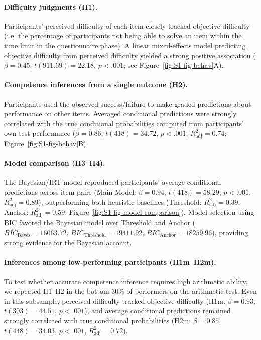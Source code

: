 \documentclass[10pt,letterpaper]{article}
\begin{document}
\paragraph{Difficulty judgments (H1).}
Participants’ perceived difficulty of each item closely tracked objective difficulty (i.e. the percentage of participants not being able to solve an item within the time limit in the questionnaire phase). A linear mixed-effects model predicting objective difficulty from perceived difficulty yielded a strong positive association ($\beta = 0.45$, $t(911.69)=22.18$, $p<.001$; see Figure~\ref{fig:S1-fig-behav}A).

\paragraph{Competence inferences from a single outcome (H2).}
Participants used the observed success/failure to make graded predictions about performance on other items. Averaged conditional predictions were strongly correlated with the true conditional probabilities computed from participants’ own test performance ($\beta = 0.86$, $t(418)=34.72$, $p<.001$, $R^2_{\text{adj}}=0.74$; Figure~\ref{fig:S1-fig-behav}B).

\paragraph{Model comparison (H3--H4).}
The Bayesian/IRT model reproduced participants’ average conditional predictions across item pairs (Main Model: $\beta = 0.94$, $t(418)=58.29$, $p<.001$, $R^2_{\text{adj}}=0.89$), outperforming both heuristic baselines (Threshold: $R^2_{\text{adj}}=0.39$; Anchor: $R^2_{\text{adj}}=0.59$; Figure~\ref{fig:S1-fig-model-comparison}). Model selection using BIC favored the Bayesian model over Threshold and Anchor ($BIC_{\text{Bayes}}=16063.72$, $BIC_{\text{Threshold}}=19411.92$, $BIC_{\text{Anchor}}=18259.96$), providing strong evidence for the Bayesian account.

\paragraph{Inferences among low-performing participants (H1m--H2m).}
To test whether accurate competence inference requires high arithmetic ability, we repeated H1--H2 in the bottom 30\% of performers on the arithmetic test. Even in this subsample, perceived difficulty tracked objective difficulty (H1m: $\beta = 0.93$, $t(303)=44.51$, $p<.001$), and average conditional predictions remained strongly correlated with true conditional probabilities (H2m: $\beta = 0.85$, $t(448)=34.03$, $p<.001$, $R^2_{\text{adj}}=0.72$).
\end{document}
